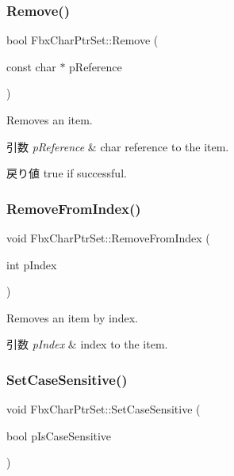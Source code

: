 \subsubsection{\texorpdfstring{Remove()}{Remove()}}
{\footnotesize\ttfamily bool Fbx\+Char\+Ptr\+Set\+::\+Remove (\begin{DoxyParamCaption}\item[{const char $\ast$}]{p\+Reference }\end{DoxyParamCaption})}

Removes an item. 
\begin{DoxyParams}{引数}
{\em p\+Reference} & char reference to the item. \\
\hline
\end{DoxyParams}
\begin{DoxyReturn}{戻り値}
true if successful. 
\end{DoxyReturn}
\mbox{\label{class_fbx_char_ptr_set_a2cfe1b7b1f73100b37decf29b3dba45e}} 
\subsubsection{\texorpdfstring{Remove\+From\+Index()}{RemoveFromIndex()}}
{\footnotesize\ttfamily void Fbx\+Char\+Ptr\+Set\+::\+Remove\+From\+Index (\begin{DoxyParamCaption}\item[{int}]{p\+Index }\end{DoxyParamCaption})}

Removes an item by index. 
\begin{DoxyParams}{引数}
{\em p\+Index} & index to the item. \\
\hline
\end{DoxyParams}
\mbox{\label{class_fbx_char_ptr_set_ad7da280af4a52c6b7aa3037fd7636f6f}} 
\subsubsection{\texorpdfstring{Set\+Case\+Sensitive()}{SetCaseSensitive()}}
{\footnotesize\ttfamily void Fbx\+Char\+Ptr\+Set\+::\+Set\+Case\+Sensitive (\begin{DoxyParamCaption}\item[{bool}]{p\+Is\+Case\+Sensitive }\end{DoxyParamCaption})}

